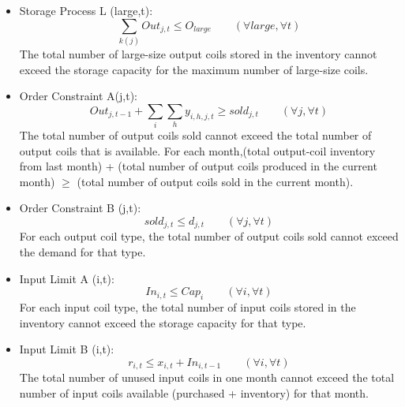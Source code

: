 \documentclass{article}[12pt]
\begin{document}
{\begin{itemize}
\item Storage Process L (large,t):
\begin{displaymath}
\sum_{k(j)} Out_{j,t} \leq O_{large} \qquad (\forall large, \forall t)
\end{displaymath}
The total number of large-size output coils stored in the inventory cannot exceed the storage capacity for the maximum number of large-size coils.\\

\item Order Constraint A(j,t):\\
\begin{displaymath}
Out_{j,t-1} + \sum_{i}\sum_{h} y_{i,h,j,t} \geq sold_{j,t} \qquad (\forall j, \forall t)
\end{displaymath}
The total number of output coils sold cannot exceed the total number of output coils that is available. For each month,(total output-coil inventory from last month) + (total number of output coils produced in the current month) $\ge$ (total number of output coils sold in the current month). \\

\item Order Constraint B (j,t): \\
\begin{displaymath}
sold_{j,t} \leq d_{j,t} \qquad (\forall j, \forall t)
\end{displaymath}
For each output coil type, the total number of output coils sold cannot exceed the demand for that type. \\

\item Input Limit A (i,t): \\
\begin{displaymath}
In_{i,t} \leq Cap_{i} \qquad (\forall i, \forall t)
\end{displaymath}
For each input coil type, the total number of input coils stored in the inventory cannot exceed the storage capacity for that type. \\

\item Input Limit B (i,t): \\
\begin{displaymath}
r_{i,t} \leq x_{i,t} + In_{i,t-1} \qquad (\forall i, \forall t)
\end{displaymath}
The total number of unused input coils in one month cannot exceed the total number of input coils available (purchased + inventory) for that month. \\


\end{itemize}}
\end{document}
